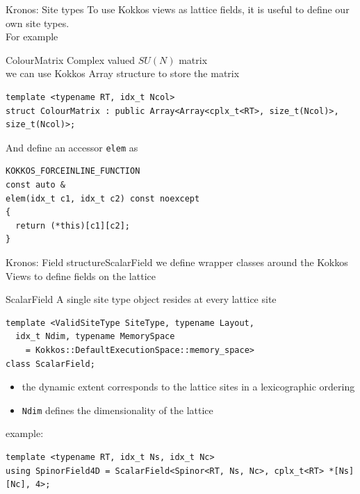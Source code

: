 \begin{frame}[fragile]{Kronos: Site types}
  To use Kokkos views as lattice fields, it is useful to define our own site types.\\

  For example
  \begin{block}{ColourMatrix}
    Complex valued $SU(N)$ matrix\\
    we can use Kokkos Array structure to
    store the matrix
  \end{block}


  \begin{verbatim}
template <typename RT, idx_t Ncol>
struct ColourMatrix : public Array<Array<cplx_t<RT>, size_t(Ncol)>, size_t(Ncol)>;
  \end{verbatim}
  
  And define an accessor \verb|elem| as

  \begin{verbatim}
KOKKOS_FORCEINLINE_FUNCTION
const auto &
elem(idx_t c1, idx_t c2) const noexcept
{
  return (*this)[c1][c2];
}
  \end{verbatim}

\end{frame}

\begin{frame}[fragile]{Kronos: Field structure}{ScalarField}
  we define wrapper classes around the Kokkos Views to
  define fields on the lattice\\

  \begin{block}{ScalarField}
    A single site type object resides at
    every lattice site
  \end{block}

  \begin{verbatim}
template <ValidSiteType SiteType, typename Layout,
  idx_t Ndim, typename MemorySpace 
    = Kokkos::DefaultExecutionSpace::memory_space>
class ScalarField;
  \end{verbatim}

  \begin{itemize}
    \item the dynamic extent corresponds to the lattice sites in a lexicographic ordering
    \item \verb|Ndim| defines the dimensionality of the lattice
  \end{itemize}

  example:

  \begin{verbatim}
template <typename RT, idx_t Ns, idx_t Nc>
using SpinorField4D = ScalarField<Spinor<RT, Ns, Nc>, cplx_t<RT> *[Ns][Nc], 4>;
  \end{verbatim}

\end{frame}

